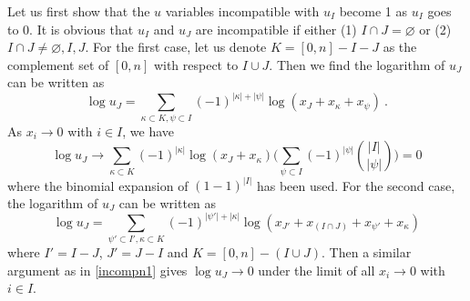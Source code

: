 \documentclass[hidelinks,12pt]{article}
\begin{document}
Let us first show that the $u$ variables incompatible with $u_{I}$ become 1 as $u_{I}$ goes to 0. It is obvious that $u_{I}$ and $u_{J}$ are incompatible if either (1) $I\cap J=  \varnothing$  or (2) $I\cap J \neq \varnothing,I, J $. For the first case, let us denote $K=[0,n]-I-J$ as the complement set of $[0,n]$ with respect to $I\cup J$. Then we find the logarithm of $u_{J}$ can be written as 
\begin{equation}
     \log u_{J} = \sum_{\kappa\subset K,\psi\subset I} (-1)^{\lvert\kappa\rvert+\lvert \psi\rvert }\log (x_{J}+x_{ \kappa} +x_{ \psi} )\:. \label{1incompuvarforPn}
\end{equation}
As $x_{i}\to 0$ with $i\in I$, we have 
\begin{equation}
   \log u_{J} \to \sum_{\kappa\subset K} (-1)^{\lvert \kappa\rvert } \log (x_{J}+x_{ \kappa})\Biggl(\sum_{\psi\subset I}(-1)^{\lvert\psi\rvert}\binom{\lvert I \rvert }{\lvert \psi \rvert }\Biggr)=0 \label{incompn1}
\end{equation}
where the binomial expansion of $(1-1)^{\lvert I \rvert}$ has been used. For the second case, the logarithm of $u_{J}$ can be written as 
\begin{equation}
   \log u_{J} = \sum_{\psi'\subset I',\kappa\subset K}(-1)^{\lvert \psi' \rvert+ \lvert \kappa\rvert}  \log (x_{J'}+ x_{(I\cap J)}+x_{ \psi'}+x_{\kappa })
\end{equation}
where $I'=I-J$, $J'=J-I$ and $K=[0,n]-(I\cup J)$. Then a similar argument as in \eqref{incompn1} gives $\log u_{J}\to 0$ under the limit of all $x_{i}\to 0$ with $i\in I$.
\end{document}
